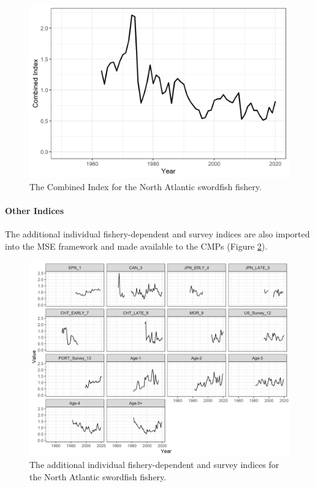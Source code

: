 \documentclass[
]{article}
\begin{document}
\begin{figure}
\includegraphics[width=25in]{../../img/Combined_Index} \caption{The Combined Index for the North Atlantic swordfish fishery.}\label{fig:index-plot}
\end{figure}

\hypertarget{other-indices}{%
\paragraph{Other Indices}\label{other-indices}}

The additional individual fishery-dependent and survey indices are also imported into the MSE framework and made available to the CMPs (Figure \ref{fig:addindex-plot}).

\begin{figure}
\includegraphics[width=33.33in]{../../img/Individual_Indices} \caption{The additional individual fishery-dependent and survey indices for the North Atlantic swordfish fishery.}\label{fig:addindex-plot}
\end{figure}
\end{document}
